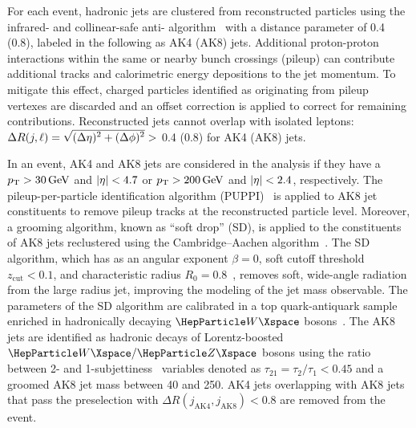 For each event, hadronic jets are clustered from reconstructed particles using the infrared- and collinear-safe anti-\kt
algorithm~\cite{Cacciari:2008gp, Cacciari:2011ma} with a distance parameter of 0.4 (0.8), labeled in the following as
AK4 (AK8) jets.  Additional proton-proton interactions within the same or nearby bunch crossings (pileup) can contribute
additional tracks and calorimetric energy depositions to the jet momentum.  To mitigate this effect, charged particles
identified as originating from pileup vertexes are discarded and an offset correction is applied to correct for
remaining contributions. Reconstructed jets cannot overlap with isolated leptons:
$\Delta R(j, \ell)= \sqrt{\smash[b]{(\Delta\eta)^2 + (\Delta\phi)^2}} >$ 0.4 (0.8) for AK4 (AK8) jets. 

In an event, AK4 and AK8 jets are considered in the analysis if they have a $p_{\mathrm{T}}>30\,\text{Ge\hspace{-.08em}V}$ and $\lvert \eta \rvert<4.7$ or
$p_{\mathrm{T}}>200\,\text{Ge\hspace{-.08em}V}$ and $\lvert \eta \rvert<2.4$, respectively.  The pileup-per-particle identification algorithm
(PUPPI)~\cite{Sirunyan:2020foa,Bertolini:2014bba} is applied to AK8 jet constituents to remove pileup tracks at the
reconstructed particle level.  Moreover, a grooming algorithm, known as ``soft drop''
(SD)\cite{Dasgupta:2013ihk,Butterworth:2008iy,Larkoski:2014wba}, is applied to the constituents of AK8 jets reclustered
using the Cambridge--Aachen algorithm~\cite{Dokshitzer:1997in,Wobisch:1998wt}.  The SD algorithm, which has as an
angular exponent $\beta = 0$, soft cutoff threshold $z_{\text{cut}} < 0.1$, and characteristic radius $R_{0} =
0.8$~\cite{Larkoski:2014wba}, removes soft, wide-angle radiation from the large radius jet, improving the modeling of
the jet mass observable.  The parameters of the SD algorithm are calibrated in a top quark-antiquark sample enriched in
hadronically decaying $\PW$ bosons~\cite{Khachatryan:2014vla}.  The AK8 jets are identified as hadronic decays of
Lorentz-boosted $\PW/\PZ$ bosons using the ratio between 2- and 1-subjettiness~\cite{Thaler:2010tr} variables denoted as
$\tau_{21}=\tau_{2}/\tau_{1} < 0.45$ and a groomed AK8 jet mass between 40 and 250\GeV. AK4 jets overlapping
with AK8 jets that pass the preselection with $\Delta R(j_{\text{AK4}}, j_{\text{AK8}}) < 0.8$ are removed from the event.  

